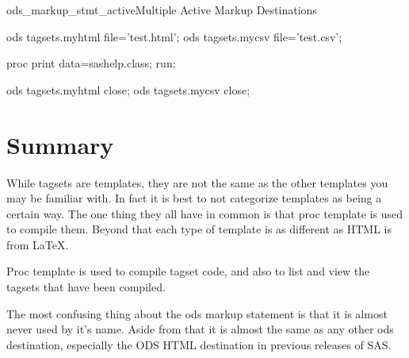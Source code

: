 \begin{fvcode}{ods_markup_stmt_active}{Multiple Active Markup Destinations}

    ods tagsets.myhtml file='test.html';
    ods tagsets.mycsv file='test.csv';

    proc print data=sashelp.class; 
    run;

    ods tagsets.myhtml close;
    ods tagsets.mycsv close;

\end{fvcode}
     
\section{Summary}
While tagsets are templates, they are not the same as the other 
templates you may be familiar with.  In fact it is best to not
categorize templates as being a certain way.  The one thing they
all have in common is that proc template is used to compile them.
Beyond that each type of template is as different as HTML is from
LaTeX.  

Proc template is used to compile tagset code, and also to list and
view the tagsets that have been compiled.

The most confusing thing about the ods markup statement is that it
is almost never used by it's name.  Aside from that it is almost
the same as any other ods destination, especially the ODS HTML
destination in previous releases of SAS.

